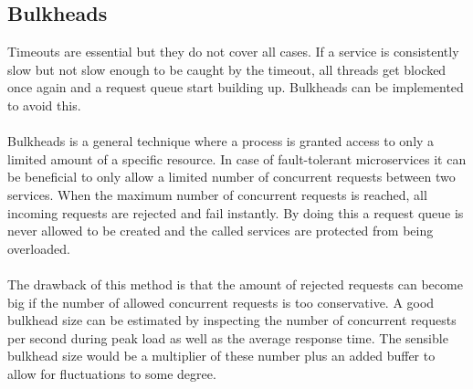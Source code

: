 \subsection{Bulkheads}
Timeouts are essential but they do not cover all cases. If a service
is consistently slow but not slow enough to be caught by the timeout,
all threads get blocked once again and a request queue start building
up. Bulkheads can be implemented to avoid this.
\\\\
Bulkheads is a general technique where a process is granted access to
only a limited amount of a specific resource. In case of
fault-tolerant microservices it can be beneficial to only allow a
limited number of concurrent requests between two services. When the
maximum number of concurrent requests is reached, all incoming
requests are rejected and fail instantly. By doing this a request
queue is never allowed to be created and the called services are
protected from being overloaded.
\\\\
The drawback of this method is that the amount of rejected requests
can become big if the number of allowed concurrent requests is too
conservative. A good bulkhead size can be estimated by inspecting the
number of concurrent requests per second during peak load as well as
the average response time. The sensible bulkhead size would be a
multiplier of these number plus an added buffer to allow for
fluctuations to some degree.

